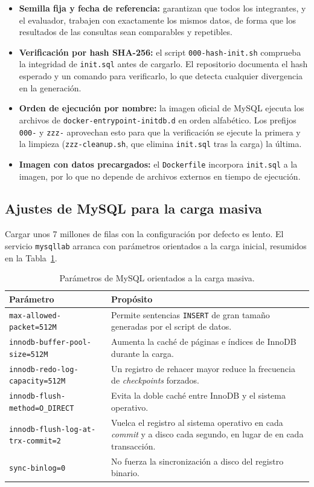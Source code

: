 \documentclass[11pt, a4paper]{article}
\begin{document}
\begin{itemize}[leftmargin=1.5em]
    \item \textbf{Semilla fija y fecha de referencia:} garantizan que todos los integrantes, y el evaluador, trabajen con exactamente los mismos datos, de forma que los resultados de las consultas sean comparables y repetibles.
    \item \textbf{Verificación por hash SHA-256:} el script \texttt{000-hash-init.sh} comprueba la integridad de \texttt{init.sql} antes de cargarlo. El repositorio documenta el hash esperado y un comando para verificarlo, lo que detecta cualquier divergencia en la generación.
    \item \textbf{Orden de ejecución por nombre:} la imagen oficial de MySQL ejecuta los archivos de \texttt{docker-entrypoint-initdb.d} en orden alfabético. Los prefijos \texttt{000-} y \texttt{zzz-} aprovechan esto para que la verificación se ejecute la primera y la limpieza (\texttt{zzz-cleanup.sh}, que elimina \texttt{init.sql} tras la carga) la última.
    \item \textbf{Imagen con datos precargados:} el \texttt{Dockerfile} incorpora \texttt{init.sql} a la imagen, por lo que no depende de archivos externos en tiempo de ejecución.
\end{itemize}

\subsection{Ajustes de MySQL para la carga masiva}
Cargar unos 7 millones de filas con la configuración por defecto es lento. El servicio \texttt{mysqllab} arranca con parámetros orientados a la carga inicial, resumidos en la Tabla~\ref{tab:mysqlparams}.

\begin{table}[H]
\centering
\small
\begin{tabular}{
    >{\raggedright\arraybackslash}p{5.2cm}
    >{\raggedright\arraybackslash}p{9.0cm}}
\toprule
\textbf{Parámetro} & \textbf{Propósito} \\
\midrule
\texttt{max-allowed-packet=512M} & Permite sentencias \texttt{INSERT} de gran tamaño generadas por el script de datos. \\
\texttt{innodb-buffer-pool-size=512M} & Aumenta la caché de páginas e índices de InnoDB durante la carga. \\
\texttt{innodb-redo-log-\allowbreak capacity=512M} & Un registro de rehacer mayor reduce la frecuencia de \textit{checkpoints} forzados. \\
\texttt{innodb-flush-method=O\_DIRECT} & Evita la doble caché entre InnoDB y el sistema operativo. \\
\texttt{innodb-flush-log-\allowbreak at-trx-commit=2} & Vuelca el registro al sistema operativo en cada \textit{commit} y a disco cada segundo, en lugar de en cada transacción. \\
\texttt{sync-binlog=0} & No fuerza la sincronización a disco del registro binario. \\
\bottomrule
\end{tabular}
\caption{Parámetros de MySQL orientados a la carga masiva.}
\label{tab:mysqlparams}
\end{table}
\end{document}
